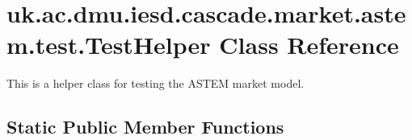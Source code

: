 \hypertarget{classuk_1_1ac_1_1dmu_1_1iesd_1_1cascade_1_1market_1_1astem_1_1test_1_1_test_helper}{\section{uk.\-ac.\-dmu.\-iesd.\-cascade.\-market.\-astem.\-test.\-Test\-Helper Class Reference}
\label{classuk_1_1ac_1_1dmu_1_1iesd_1_1cascade_1_1market_1_1astem_1_1test_1_1_test_helper}
}


This is a helper class for testing the A\-S\-T\-E\-M market model.  


\subsection*{Static Public Member Functions}
